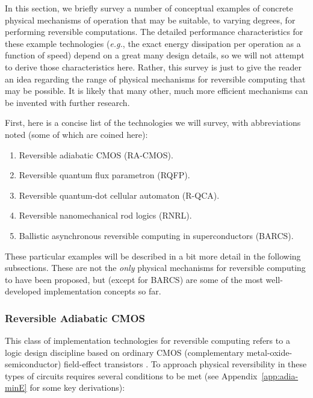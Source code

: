 \documentclass[preprints,article,accept,moreauthors,pdftex]{Definitions/mdpi}
\begin{document}
\begin{paracol}{2}
In this section, we briefly survey a number of conceptual examples of concrete physical mechanisms of operation that may be suitable, to varying degrees, for performing reversible computations. The detailed performance characteristics for these example technologies (\emph{e.g.}, the exact energy dissipation per operation as a function of speed) depend on a great many design details, so we will not attempt to derive those characteristics here. Rather, this survey is just to give the reader an idea regarding the range of physical mechanisms for reversible computing that may be possible. It is likely that many other, much more efficient mechanisms can be invented with further research.

First, here is a concise list of the technologies we will survey, with abbreviations noted (some of which are coined here):

\begin{enumerate}
    \item Reversible adiabatic CMOS (RA-CMOS).
    \item Reversible quantum flux parametron (RQFP).
    \item Reversible quantum-dot cellular automaton (R-QCA).
    \item Reversible nanomechanical rod logics (RNRL).
    \item Ballistic asynchronous reversible computing in superconductors (BARCS).
\end{enumerate}

These particular examples will be described in a bit more detail in the following subsections. These are not the \emph{only} physical mechanisms for reversible computing to have been proposed, but (except for BARCS) are some of the most well-developed implementation concepts so far.

\subsubsection{Reversible Adiabatic CMOS}
\label{sssec:ra-cmos}

This class of implementation technologies for reversible computing refers to a logic design discipline based on ordinary CMOS (complementary metal-oxide-semiconductor) field-effect transistors \cite{YK93,You94,Fra99,Ven+03,ZFW19,Fra+20a,Fra+20b}. To approach physical reversibility in these types of circuits requires several conditions to be met (see Appendix~\ref{app:adia-minE} for some key derivations):


\end{paracol}
\end{document}
